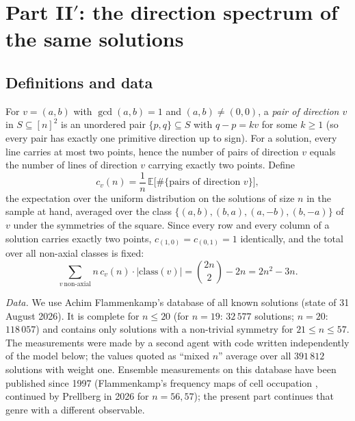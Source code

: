 \documentclass[11pt,a4paper]{article}
\begin{document}
\section{Part II\texorpdfstring{$'$}{'}: the direction spectrum of the same solutions}\label{s:spectrum}

\subsection{Definitions and data}\label{s:spdata}
For $v=(a,b)$ with $\gcd(a,b)=1$ and $(a,b)\ne(0,0)$, a \emph{pair of direction $v$} in $S\subseteq[n]^2$ is an unordered pair
$\{p,q\}\subseteq S$ with $q-p=kv$ for some $k\ge1$ (so every pair has exactly one primitive direction up to sign).
For a solution, every line carries at most two points, hence the number of pairs of direction $v$ equals the number of
lines of direction $v$ carrying exactly two points.  Define
\[c_v(n)=\frac{1}{n}\,\mathbb{E}\bigl[\#\{\text{pairs of direction }v\}\bigr],\]
the expectation over the uniform distribution on the solutions of size $n$ in the sample at hand, averaged over the
class $\{(a,b),(b,a),(a,-b),(b,-a)\}$ of $v$ under the symmetries of the square.  Since every row and every column of a
solution carries exactly two points, $c_{(1,0)}=c_{(0,1)}=1$ identically, and the total over all non-axial classes
is fixed:
\begin{equation}\label{eq:total}
\sum_{v\ \text{non-axial}} n\,c_v(n)\cdot|\text{class}(v)| = \binom{2n}{2}-2n = 2n^2-3n .
\end{equation}

\emph{Data.}  We use Achim Flammenkamp's database of all known solutions (state of 31 August 2026).  It is complete
for $n\le20$ (for $n=19$: $32\,577$ solutions; $n=20$: $118\,057$) and contains only solutions with a non-trivial
symmetry for $21\le n\le57$.  The measurements were made by a second agent with code written independently of the
model below; the values quoted as ``mixed $n$'' average over all $391\,812$ solutions with weight one.  Ensemble
measurements on this database have been published since 1997 (Flammenkamp's frequency maps of cell occupation
\cite{Density}, continued by Prellberg in 2026 for $n=56,57$); the present part continues that genre with a
different observable.
\end{document}
